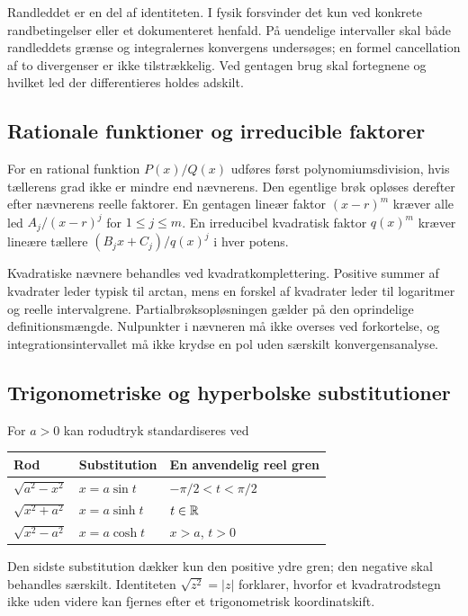 Randleddet er en del af identiteten. I fysik forsvinder det kun ved
konkrete randbetingelser eller et dokumenteret henfald. På uendelige
intervaller skal både randleddets grænse og integralernes konvergens
undersøges; en formel cancellation af to divergenser er ikke tilstrækkelig.
Ved gentagen brug skal fortegnene og hvilket led der differentieres
holdes adskilt.

\subsection{Rationale funktioner og irreducible faktorer}
For en rational funktion $P(x)/Q(x)$ udføres først polynomiumsdivision,
hvis tællerens grad ikke er mindre end nævnerens. Den egentlige brøk
opløses derefter efter nævnerens reelle faktorer. En gentagen lineær
faktor $(x-r)^m$ kræver alle led $A_j/(x-r)^j$ for $1\le j\le m$.
En irreducibel kvadratisk faktor $q(x)^m$ kræver lineære tællere
$(B_jx+C_j)/q(x)^j$ i hver potens.

Kvadratiske nævnere behandles ved kvadratkomplettering. Positive summer
af kvadrater leder typisk til arctan, mens en forskel af kvadrater leder
til logaritmer og reelle intervalgrene. Partialbrøksopløsningen gælder
på den oprindelige definitionsmængde. Nulpunkter i nævneren må ikke
overses ved forkortelse, og integrationsintervallet må ikke krydse en
pol uden særskilt konvergensanalyse.

\subsection{Trigonometriske og hyperbolske substitutioner}
For $a>0$ kan rodudtryk standardiseres ved
\begin{center}
\begin{tabular}{@{}lll@{}}
\toprule
Rod & Substitution & En anvendelig reel gren\\
\midrule
$\sqrt{a^2-x^2}$ & $x=a\sin t$ & $-\pi/2<t<\pi/2$\\
$\sqrt{x^2+a^2}$ & $x=a\sinh t$ & $t\in\mathbb{R}$\\
$\sqrt{x^2-a^2}$ & $x=a\cosh t$ & $x>a$, $t>0$\\
\bottomrule
\end{tabular}
\end{center}
Den sidste substitution dækker kun den positive ydre gren; den negative
skal behandles særskilt. Identiteten $\sqrt{z^2}=|z|$ forklarer,
hvorfor et kvadratrodstegn ikke uden videre kan fjernes efter et
trigonometrisk koordinatskift.

